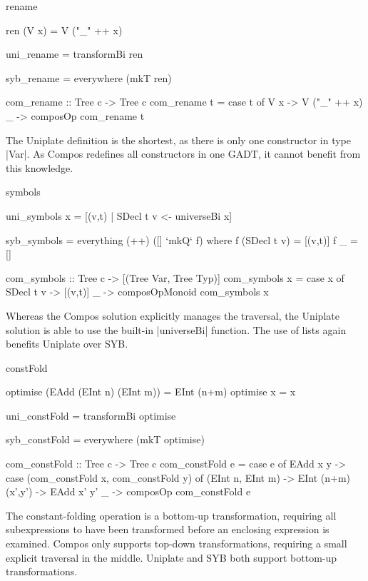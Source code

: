 \begin{examplename}{rename}

\ignore\begin{code}
ren (V x) = V ("_" ++ x)

uni_rename = transformBi ren

syb_rename = everywhere (mkT ren)

com_rename :: Tree c -> Tree c
com_rename t = case t of
    V x -> V ("_" ++ x)
    _   -> composOp com_rename t
\end{code}

The Uniplate definition is the shortest, as there is only one constructor in type |Var|. As Compos redefines all constructors in one GADT, it cannot benefit from this knowledge.
\end{examplename}

\begin{examplename}{symbols}

\ignore\begin{code}
uni_symbols x = [(v,t) | SDecl t v <- universeBi x]
\end{code}
\ignore\begin{code}
syb_symbols = everything (++) ([] `mkQ` f)
    where  f (SDecl t v)  = [(v,t)]
           f _            = []

com_symbols :: Tree c -> [(Tree Var, Tree Typ)]
com_symbols x = case x of
    SDecl t v -> [(v,t)]
    _ -> composOpMonoid com_symbols x
\end{code}

Whereas the Compos solution explicitly manages the traversal, the Uniplate solution is able to use the built-in |universeBi| function. The use of lists again benefits Uniplate over SYB.
\end{examplename}

\begin{examplename}{constFold}

\ignore\begin{code}
optimise (EAdd (EInt n) (EInt m)) = EInt (n+m)
optimise x = x

uni_constFold = transformBi optimise

syb_constFold = everywhere (mkT optimise)

com_constFold :: Tree c -> Tree c
com_constFold e = case e of
    EAdd x y -> case  (com_constFold x, com_constFold y) of
                      (EInt n, EInt m) -> EInt (n+m)
                      (x',y') -> EAdd x' y'
    _ -> composOp com_constFold e
\end{code}

The constant-folding operation is a bottom-up transformation, requiring all subexpressions to have been transformed before an enclosing expression is examined. Compos only supports top-down transformations, requiring a small explicit traversal in the middle. Uniplate and SYB both support bottom-up transformations.
\end{examplename}

